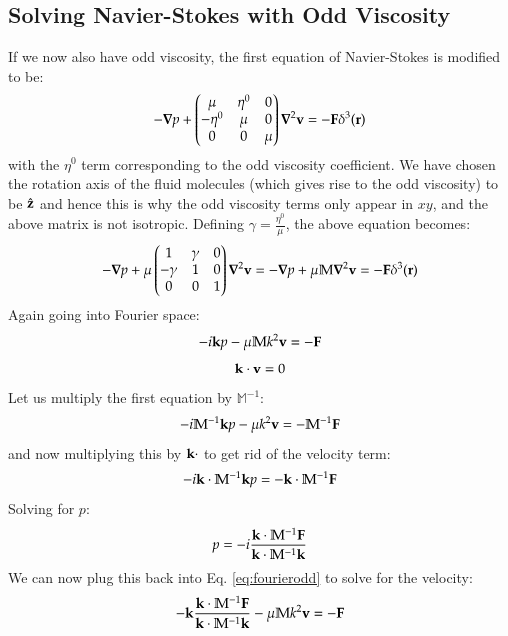 \subsection{Solving Navier-Stokes with Odd Viscosity}
If we now also have odd viscosity, the first equation of Navier-Stokes is modified to be:
\begin{equation}
    -\nabla p + \m{\mu & \eta^0 & 0 \\ -\eta^0 & \mu & 0 \\ 0 & 0 & \mu}\nabla^2\v{v} = -\v{F}\delta^3(\v{r})
\end{equation}
with the $\eta^0$ term corresponding to the odd viscosity coefficient. We have chosen the rotation axis of the fluid molecules (which gives rise to the odd viscosity) to be $\hat{\mathbf{z}}$ and hence this is why the odd viscosity terms only appear in $xy$, and the above matrix is not isotropic. Defining $\gamma = \frac{\eta^0}{\mu}$, the above equation becomes:
\begin{equation}
    -\nabla p + \mu\m{1 & \gamma & 0 \\ -\gamma & 1 & 0 \\ 0 & 0 & 1}\nabla^2\v{v} = -\nabla p + \mu\mathbb{M}\nabla^2 \v{v} = -\v{F}\delta^3(\v{r})
\end{equation}
Again going into Fourier space:
\begin{equation}\label{eq:fourierodd}
    -i\mathbf{k}p - \mu \mathbb{M}k^2\mathbf{v} = -\mathbf{F}
\end{equation}
\begin{equation}
    \mathbf{k} \cdot \mathbf{v} = 0
\end{equation}
Let us multiply the first equation by $\mathbb{M}^{-1}$:
\begin{equation}
    -i\mathbb{M}^{-1}\mathbf{k}p - \mu k^2 \mathbf{v} = -\mathbb{M}^{-1}\mathbf{F}
\end{equation}
and now multiplying this by $\mathbf{k}\cdot$ to get rid of the velocity term:
\begin{equation}
    -i\mathbf{k} \cdot \mathbb{M}^{-1}\mathbf{k}p = -\mathbf{k}\cdot \mathbb{M}^{-1}\mathbf{F}
\end{equation}
Solving for $p$:
\begin{equation}
    p = -i\frac{\mathbf{k} \cdot \mathbb{M}^{-1}\mathbf{F}}{\mathbf{k} \cdot \mathbb{M}^{-1}\mathbf{k}}
\end{equation}
We can now plug this back into Eq. \eqref{eq:fourierodd} to solve for the velocity:
\begin{equation}
    -\mathbf{k}\frac{\mathbf{k} \cdot \mathbb{M}^{-1}\mathbf{F}}{\mathbf{k} \cdot \mathbb{M}^{-1}\mathbf{k}} - \mu \mathbb{M}k^2\mathbf{v} = -\mathbf{F}
\end{equation}
